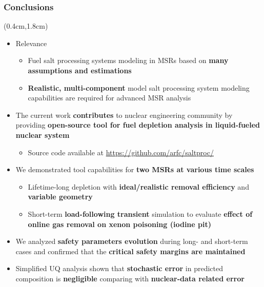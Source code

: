 \begin{frame}
\frametitle{Conclusions}
\begin{textblock*}{12cm}(0.4cm,1.8cm) %
	\begin{itemize}
		\itemsep1em
		\item Relevance
		\begin{itemize}
			\itemsep0.5em
			\item Fuel salt processing systems modeling in \glspl{MSR} based 
			on \textbf{many assumptions and estimations}
			\item \textbf{Realistic, multi-component} model salt 
			processing system modeling capabilities are required for advanced 
			\gls{MSR} analysis
		\end{itemize} 
		\item The current work \textbf{contributes} to nuclear engineering 
		community by providing \textbf{open-source tool for fuel depletion 
		analysis in liquid-fueled nuclear system}
			\begin{itemize}
			\itemsep0.5em
			\item Source code available at 
			\url{https://github.com/arfc/saltproc/}
			\end{itemize}
		\item We demonstrated tool capabilities for \textbf{two MSRs at 
		various time scales}
		\begin{itemize}
			\itemsep0.5em
			\item Lifetime-long depletion with \textbf{ideal/realistic removal 
			efficiency} and \textbf{variable geometry}
			\item Short-term \textbf{load-following transient} simulation to 
			evaluate \textbf{effect of online gas removal on xenon poisoning 
			(iodine pit)}
		\end{itemize}
		\item We analyzed \textbf{safety parameters evolution} during long- 
		and short-term cases and confirmed that the \textbf{critical safety 
		margins are maintained}
		\item Simplified UQ analysis shown that \textbf{stochastic error} in 
		predicted composition is \textbf{negligible} comparing with 
		\textbf{nuclear-data related error}
	\end{itemize}
\end{textblock*}
\end{frame}

